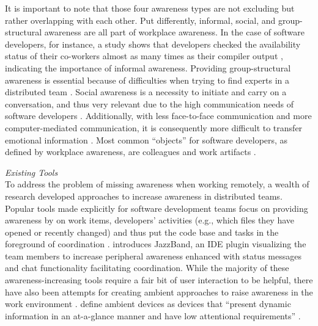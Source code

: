 \noindent It is important to note that those four awareness types are not excluding but rather overlapping with each other. Put differently, informal, social, and group-structural awareness are all part of workplace awareness. In the case of software developers, for instance, a study shows that developers checked the availability status of their co-workers almost as many times as their compiler output \autocite{ko2007information}, indicating the importance of informal awareness. Providing group-structural awareness is essential because of difficulties when trying to find experts in a distributed team \autocite{herbsleb2003empirical}. Social awareness is a necessity to initiate and carry on a conversation, and thus very relevant due to the high communication needs of software developers \autocite{perry1994people}. Additionally, with less face-to-face communication and more computer-mediated communication, it is consequently more difficult to transfer emotional information \autocite{rivera1996effects}. Most common \enquote{objects} for software developers, as defined by workplace awareness, are colleagues and work artifacts \autocite{ko2007information}.

\medskip\noindent\textit{Existing Tools}\\
To address the problem of missing awareness when working remotely, a wealth of research developed approaches to increase awareness in distributed teams. Popular tools made explicitly for software development teams focus on providing awareness by on work items, developers’ activities (e.g., which files they have opened or recently changed) and thus put the code base and tasks in the foreground of coordination \autocite{biehl2007fastdash, jakobsen2009wipdash, eick1992seesoft, deline2005easing}. \textcite{cheng2003jazzing} introduces JazzBand, an IDE plugin visualizing the team members to increase peripheral awareness enhanced with status messages and chat functionality facilitating coordination. While the majority of these awareness-increasing tools require a fair bit of user interaction to be helpful, there have also been attempts for creating ambient approaches to raise awareness in the work environment \autocite{morrison2020facilitating, otjacques2006ambient, downs2012ambient, alavi2012ambient, rocker2004using}. \citeauthor{downs2012ambient} define ambient devices as devices that \enquote{present dynamic information in an at-a-glance manner and have low attentional requirements} \autocite[p.~508]{downs2012ambient}.

